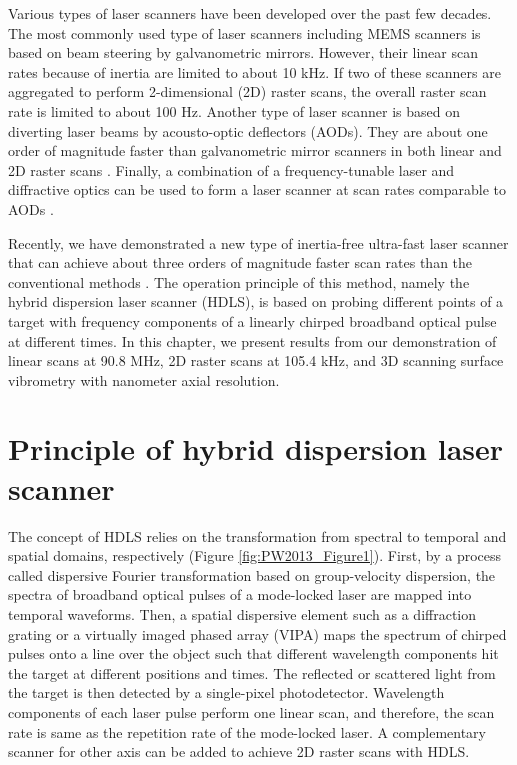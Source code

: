 Various types of laser scanners have been developed over the past few decades. The most commonly used type of laser scanners including MEMS scanners \cite{conant2002micromachined} is based on beam steering by galvanometric mirrors. However, their linear scan rates because of inertia are limited to about 10 kHz. If two of these scanners are aggregated to perform 2-dimensional (2D) raster scans, the overall raster scan rate is limited to about 100 Hz. Another type of laser scanner is based on diverting laser beams by acousto-optic deflectors (AODs). They are about one order of magnitude faster than galvanometric mirror scanners in both linear and 2D raster scans \cite{marshall2011handbook,pape1994design}. Finally, a combination of a frequency-tunable laser and diffractive optics can be used to form a laser scanner at scan rates comparable to AODs \cite{yaqoob2004passive,boudoux2005rapid}.

Recently, we have demonstrated a new type of inertia-free ultra-fast laser scanner that can achieve about three orders of magnitude faster scan rates than the conventional methods \cite{goda2012hybrid}. The operation principle of this method, namely the hybrid dispersion laser scanner (HDLS), is based on probing different points of a target with frequency components of a linearly chirped broadband optical pulse at different times. In this chapter, we present results from our demonstration of linear scans at 90.8 MHz, 2D raster scans at 105.4 kHz, and 3D scanning surface vibrometry with nanometer axial resolution.

\section{Principle of hybrid dispersion laser scanner}

The concept of HDLS relies on the transformation from spectral to temporal and spatial domains, respectively (Figure \ref{fig:PW2013_Figure1}). First, by a process called dispersive Fourier transformation \cite{kelkar1999time,chou2007femtosecond,goda2009theory,goda2009serial,goda2008amplified} based on group-velocity dispersion, the spectra of broadband optical pulses of a mode-locked laser are mapped into temporal waveforms. Then, a spatial dispersive element such as a diffraction grating or a virtually imaged phased array (VIPA) maps the spectrum of chirped pulses onto a line over the object such that different wavelength components hit the target at different positions and times. The reflected or scattered light from the target is then detected by a single-pixel photodetector. Wavelength components of each laser pulse perform one linear scan, and therefore, the scan rate is same as the repetition rate of the mode-locked laser. A complementary scanner for other axis can be added to achieve 2D raster scans with HDLS.

